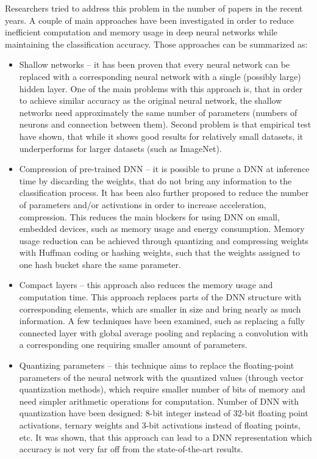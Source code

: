 \documentclass[licencjacka]{pracamgr}
\begin{document}
	Researchers tried to address this problem in the number of papers in the recent years. A couple of main approaches have been investigated in order to reduce inefficient computation and memory usage in deep neural networks while maintaining the classification accuracy. Those approaches can be summarized as:

	\begin{itemize}
		\item Shallow networks -- it has been proven that every neural network can be replaced with a corresponding neural network with a single (possibly large) hidden layer. One of the main problems with this approach is, that in order to achieve similar accuracy as the original neural network, the shallow networks need approximately the same number of parameters (numbers of neurons and connection between them). Second problem is that empirical test have shown, that while it shows good results for relatively small datasets, it underperforms for larger datasets (such as ImageNet).
		\item Compression of pre-trained DNN -- it is possible to prune a DNN at inference time by discarding the weights, that do not bring any information to the classification process. It has been also further proposed \cite{scale} to reduce the number of parameters and/or activations in order to increase acceleration, compression. This reduces the main blockers for using DNN on small, embedded devices, such as memory usage and energy consumption. Memory usage reduction can be achieved through quantizing and compressing weights with Huffman coding or hashing weights, such that the weights assigned to one hash bucket share the same parameter.
		\item Compact layers -- this approach also reduces the memory usage and computation time. This approach replaces parts of the DNN structure with corresponding elements, which are smaller in size and bring nearly as much information. A few techniques have been examined, such as replacing a fully connected layer with global average pooling and replacing a convolution with a corresponding one requiring smaller amount of parameters.
		\item Quantizing parameters -- this technique aims to replace the floating-point parameters of the neural network with the quantized values (through vector quantization methods), which require smaller number of bits of memory and need simpler arithmetic operations for computation. Number of DNN with quantization have been designed: 8-bit integer instead of 32-bit floating point activations, ternary weights and 3-bit activations instead of floating points, etc. It was shown, that this approach can lead to a DNN representation which accuracy is not very far off from the state-of-the-art results.

\end{itemize}
\end{document}
